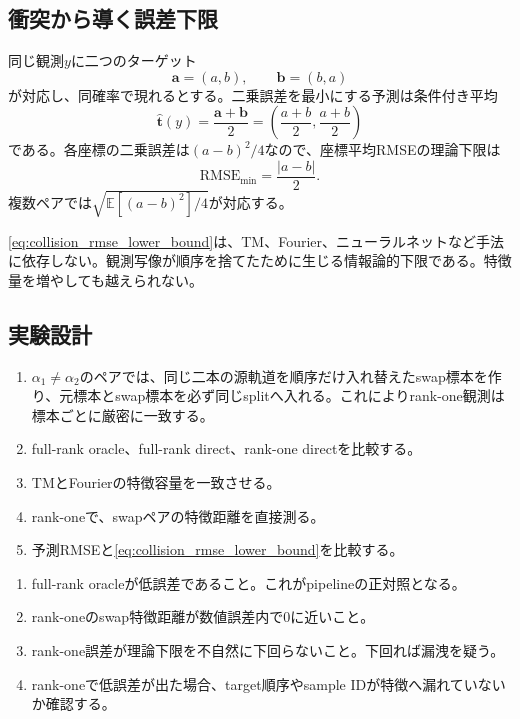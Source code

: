 \documentclass[a4paper,11pt,oneside,openany]{ltjsbook}
\newcommand{\E}{\mathbb{E}}
\newcommand{\vect}[1]{\bm{#1}}
\begin{document}
\subsection{衝突から導く誤差下限}

同じ観測\(y\)に二つのターゲット
\begin{equation}
  \vect a=(a,b),\qquad \vect b=(b,a)
\end{equation}
が対応し、同確率で現れるとする。二乗誤差を最小にする予測は条件付き平均
\begin{equation}
  \widehat{\vect t}(y)
  =\frac{\vect a+\vect b}{2}
  =\left(\frac{a+b}{2},\frac{a+b}{2}\right)
  \label{eq:collision_optimal_predictor}
\end{equation}
である。各座標の二乗誤差は\((a-b)^2/4\)なので、座標平均RMSEの理論下限は
\begin{equation}
  \mathrm{RMSE}_{\min}
  =\frac{|a-b|}{2}.
  \label{eq:collision_rmse_lower_bound}
\end{equation}
複数ペアでは\(\sqrt{\E[(a-b)^2]/4}\)が対応する。

\begin{theorybox}
\cref{eq:collision_rmse_lower_bound}は、TM、Fourier、ニューラルネットなど手法に依存しない。観測写像が順序を捨てたために生じる情報論的下限である。特徴量を増やしても越えられない。
\end{theorybox}

\subsection{実験設計}

\begin{enumerate}
  \item \(\alpha_1\neq\alpha_2\)のペアでは、同じ二本の源軌道を順序だけ入れ替えたswap標本を作り、元標本とswap標本を必ず同じsplitへ入れる。これによりrank-one観測は標本ごとに厳密に一致する。
  \item full-rank oracle、full-rank direct、rank-one directを比較する。
  \item TMとFourierの特徴容量を一致させる。
  \item rank-oneで、swapペアの特徴距離を直接測る。
  \item 予測RMSEと\cref{eq:collision_rmse_lower_bound}を比較する。
\end{enumerate}

\begin{gatebox}
\begin{enumerate}
  \item full-rank oracleが低誤差であること。これがpipelineの正対照となる。
  \item rank-oneのswap特徴距離が数値誤差内で0に近いこと。
  \item rank-one誤差が理論下限を不自然に下回らないこと。下回れば漏洩を疑う。
  \item rank-oneで低誤差が出た場合、target順序やsample IDが特徴へ漏れていないか確認する。
\end{enumerate}
\end{gatebox}
\end{document}
